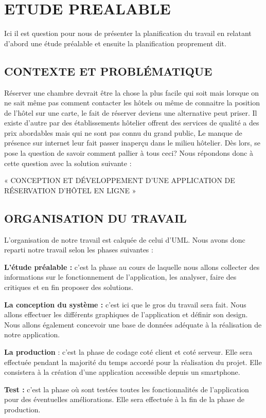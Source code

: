 \chapter{ETUDE PREALABLE}

Ici il est question pour nous de présenter la planification du travail en relatant d’abord une étude préalable et ensuite la planification proprement dit.

\section{CONTEXTE ET PROBLÉMATIQUE}

Réserver une chambre devrait être la chose la plus facile qui soit mais lorsque on ne sait même pas comment contacter les hôtels ou même de connaitre la position de l’hôtel sur une carte, le fait de réserver deviens une alternative peut priser. Il existe d’autre par des établissements hôtelier offrent des services de qualité a des prix abordables mais qui ne sont pas connu du grand public, Le manque de présence sur internet leur fait passer inaperçu dans le milieu hôtelier.  Dès lors, se pose la question de savoir comment pallier à tous ceci? Nous répondons donc à cette question avec la solution suivante :\\

\begin{center}
 « CONCEPTION ET DÉVELOPPEMENT D’UNE APPLICATION DE RÉSERVATION D’HÔTEL EN LIGNE »
\end{center}

\section{ORGANISATION DU TRAVAIL}
L’organisation de notre travail est calquée de celui d’UML. Nous avons donc reparti notre travail selon les phases suivantes :

\begin{list}{•}{ }
	\item \textbf{L’étude préalable :} c’est la phase au cours de laquelle nous allons collecter des informations sur le fonctionnement de l’application, les analyser, faire des critiques et en fin proposer des solutions.
    \item \textbf{La conception du système :} c’est ici que le gros du travail sera fait. Nous allons effectuer les différents graphiques de l’application et définir son design. Nous allons également concevoir une base de données adéquate à la réalisation de notre application.
    \item \textbf{La production }: c’est la phase de codage coté client et coté serveur. Elle sera effectuée pendant la majorité du temps accordé pour la réalisation du projet. Elle consistera à la création d’une application accessible depuis un smartphone.
    \item \textbf{Test :} c’est la phase où sont testées toutes les fonctionnalités de l’application pour des éventuelles améliorations. Elle sera effectuée à la fin de la phase de production.

\end{list}

